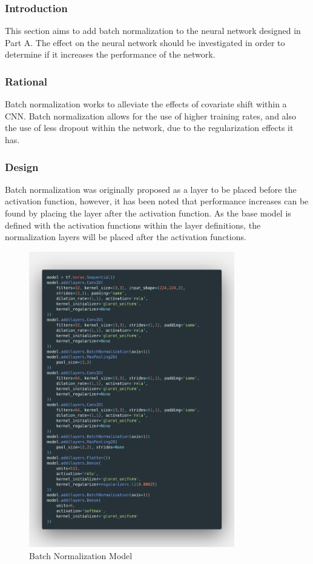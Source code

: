\subsubsection{Introduction}

This section aims to add batch normalization to the neural network designed in
Part A. The effect on the neural network should be investigated in order to
determine if it increases the performance of the network.

\subsubsection{Rational}

Batch normalization works to alleviate the effects of covariate shift within a
CNN. Batch normalization allows for the use of higher training rates, and also
the use of less dropout within the network, due to the regularization effects it
has.

\subsubsection{Design}

Batch normalization was originally proposed as a layer to be placed before the
activation function, however, it has been noted that performance increases can
be found by placing the layer after the activation function. As the base model
is defined with the activation functions within the layer definitions, the
normalization layers will be placed after the activation functions.

\begin{figure}[H]
	\centering
	\includegraphics[width=0.8\textwidth]{images/Code/batchnorm}
	\caption{Batch Normalization Model}
	\label{fig:images-Code-batchnorm}
\end{figure}

